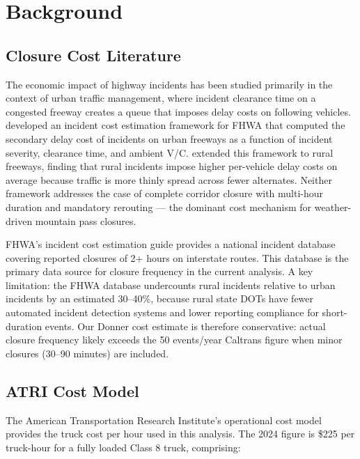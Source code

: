 \section{Background}

\subsection{Closure Cost Literature}

The economic impact of highway incidents has been studied primarily in the context of urban
traffic management, where incident clearance time on a congested freeway creates a queue
that imposes delay costs on following vehicles. \citet{Chin2004} developed an incident
cost estimation framework for FHWA that computed the secondary delay cost of incidents
on urban freeways as a function of incident severity, clearance time, and ambient V/C.
\citet{Taylor2006} extended this framework to rural freeways, finding that rural incidents
impose higher per-vehicle delay costs on average because traffic is more thinly spread
across fewer alternates. Neither framework addresses the case of complete corridor closure
with multi-hour duration and mandatory rerouting --- the dominant cost mechanism for
weather-driven mountain pass closures.

FHWA's incident cost estimation guide \citep{FHWA_incident2022} provides a national
incident database covering reported closures of 2+ hours on interstate routes. This
database is the primary data source for closure frequency in the current analysis. A
key limitation: the FHWA database undercounts rural incidents relative to urban incidents
by an estimated 30--40\%, because rural state DOTs have fewer automated incident detection
systems and lower reporting compliance for short-duration events. Our Donner cost estimate
is therefore conservative: actual closure frequency likely exceeds the 50 events/year
Caltrans figure when minor closures (30--90 minutes) are included.

\subsection{ATRI Cost Model}

The American Transportation Research Institute's operational cost model \citep{ATRI_costs2024}
provides the truck cost per hour used in this analysis. The 2024 figure is \$225 per
truck-hour for a fully loaded Class 8 truck, comprising:

